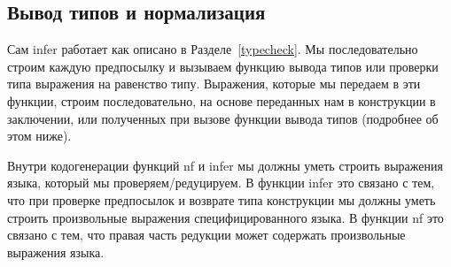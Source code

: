 \subsection{Вывод типов и нормализация}\label{nf_infer}
Сам infer работает как описано в Разделе~\ref{typecheck}. Мы последовательно строим каждую предпосылку и вызываем функцию вывода типов или проверки типа выражения на равенство типу. Выражения, которые мы передаем в эти функции, строим последовательно, на основе переданных нам в конструкции в заключении, или полученных при вызове функции вывода типов (подробнее об этом ниже).

Внутри кодогенерации функций nf и infer мы должны уметь строить выражения языка, который мы проверяем/редуцируем. В функции infer это связано с тем, что при проверке предпосылок и возврате типа конструкции мы должны уметь строить произвольные выражения специфицированного языка. В функции nf это связано с тем, что правая часть редукции может содержать произвольные выражения языка.



